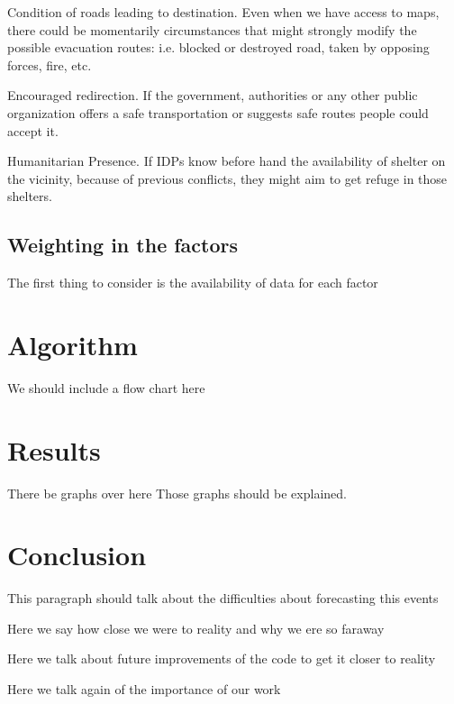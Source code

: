 \documentclass[11pt]{article}
\begin{document}
Condition of roads leading to destination.  Even when we have access to maps,
there could be momentarily circumstances that might strongly modify the possible
evacuation routes: i.e. blocked or destroyed road, taken by opposing forces,
fire, etc.

Encouraged redirection.
If the government, authorities or any other public organization offers a safe transportation or suggests safe routes people could accept it.

Humanitarian Presence.
If IDPs know before hand the availability of shelter on the vicinity, because of
previous conflicts, they might aim to get refuge in those shelters.
\subsection{Weighting in the factors}
\label{sec-2-2}
The first thing to consider is the availability of data for each factor

\section{Algorithm}
\label{sec-3}
We should include a flow chart here
\section{Results}
\label{sec-4}
There be graphs over here
Those graphs should be explained.
\section{Conclusion}
\label{sec-5}
This paragraph should talk about the difficulties about forecasting this events

Here we say how close we were to reality and why we ere so faraway

Here we talk about future improvements of the code to get it closer to reality

Here we talk again of the importance of our work
\end{document}
